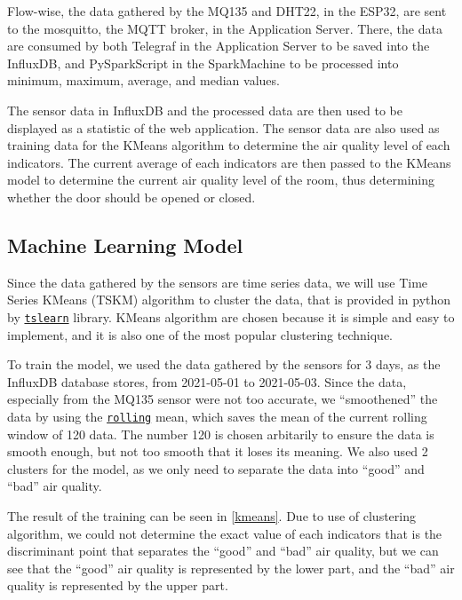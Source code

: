 Flow-wise, the data gathered by the MQ135 and DHT22, in the
ESP32, are sent to the mosquitto, the MQTT broker, in the
Application Server.
There, the data are consumed by both Telegraf in the
Application Server to be saved into the InfluxDB, and
PySparkScript in the SparkMachine to be processed into
minimum, maximum, average, and median values.

The sensor data in InfluxDB and the processed data are then
used to be displayed as a statistic of the web application.
The sensor data are also used as training data for the KMeans
algorithm to determine the air quality level of each
indicators. The current average of each indicators are then
passed to the KMeans model to determine the current air
quality level of the room, thus determining whether the door
should be opened or closed.

\subsection{Machine Learning Model}
Since the data gathered by the sensors are time
series data, we will use Time Series KMeans (TSKM)
algorithm to cluster the data, that is provided in
python by
\href{https://tslearn.readthedocs.io/en/stable/}{\texttt{tslearn}} library.
KMeans algorithm are chosen because it is simple and
easy to implement, and it is also one of the most
popular clustering technique.

To train the model, we used the data gathered by the
sensors for 3 days, as the InfluxDB database stores,
from 2021-05-01 to 2021-05-03. Since the data,
especially from the MQ135 sensor were not too
accurate, we ``smoothened'' the data by using the
\href{https://pandas.pydata.org/docs/reference/api/pandas.DataFrame.rolling.html}{\texttt{rolling}} mean, which saves
the mean of the current rolling window of 120 data. The number
120 is chosen arbitarily to ensure the data is smooth enough,
but not too smooth that it loses its meaning. We also used 2
clusters for the model, as we only need to separate the data
into ``good'' and ``bad'' air quality.

The result of the training can be seen in
\ref{kmeans}. Due to use of clustering algorithm, we could not
determine the exact value of each indicators that is the
discriminant point that separates the ``good'' and ``bad''
air quality, but we can see that the ``good'' air quality is
represented by the lower part, and the ``bad'' air quality is
represented by the upper part.

